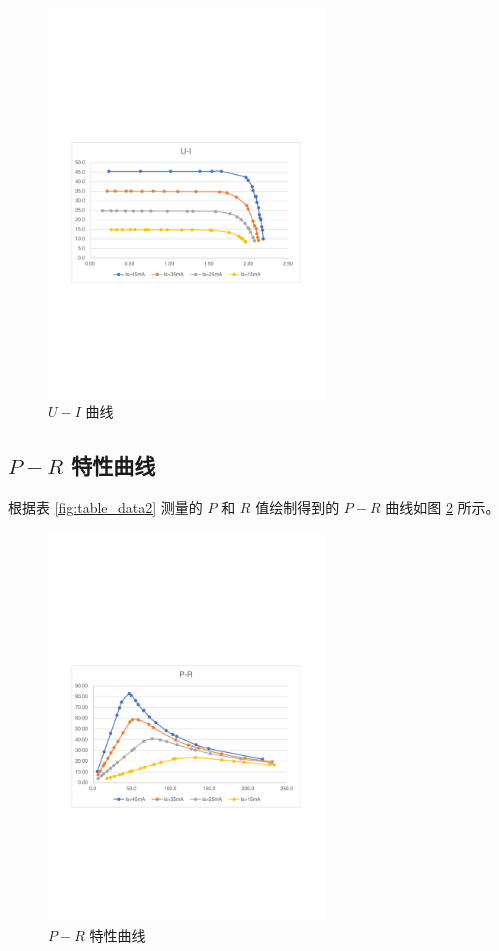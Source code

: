 \documentclass[12pt]{article}
\begin{document}
\begin{figure}[H] %
    \centering
    \includegraphics[width=0.65\textwidth]{./figures/图1.pdf} 
    \caption{$U-I$ 曲线}
    \label{fig:pict_data1}
\end{figure}

\subsection{\normalfont $P-R$ 特性曲线}

根据表 \ref{fig:table_data2} 测量的 $P$ 和 $R$ 值绘制得到的 $P-R$ 曲线如图 \ref{fig:pict_data2} 所示。

\begin{figure}[H] %
    \centering
    \includegraphics[width=0.65\textwidth]{./figures/图2.pdf} 
    \caption{$P-R$ 特性曲线}
    \label{fig:pict_data2}
\end{figure}
\end{document}
